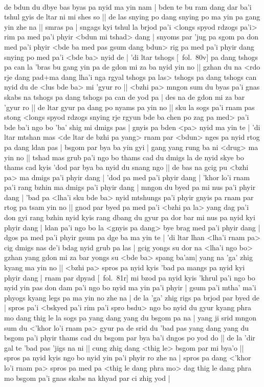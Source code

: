 \documentclass[12pt]{article}
\begin{document}
\textbf{\TVB}\\
de bdun du dbye bas byas pa nyid ma yin nam | bden te bu ram dang dar ba'i tshul gyis de ltar ni mi shes so || de las snying po dang snying po ma yin pa gang yin zhe na || smras pa | sngags kyi tshul la brjod pa'i <longs spyod rdzogs pa'i> rim pa med pa'i phyir <bdun mi tshad> dang | snyoms par 'jug pa sgom pa don med pa'i phyir <bde ba med pas gsum dang bdun> rig pa med pa'i phyir dang snying po med pa'i <bde ba> nyid de | 'di ltar tshogs [\TVB\ fol.\ 80v] pa dang tshogs pa can la 'bras bu gang yin pa de gdon mi za ba nyid yin no || gzhan du na <rdo rje dang pad+ma dang lha'i nga rgyal tshogs pa las> tshogs pa dang tshogs can nyid du de <lus bde ba> mi 'gyur ro || <bzhi pa> mngon sum du byas pa'i gnas skabs na tshogs pa dang tshogs pa can de yod pa | des na de gdon mi za bar 'gyur ro || de ltar gyur pa dang po nyams pa yin no || sku la sogs pa'i rnam pas stong <longs spyod rdzogs snying rje rgyun bde ba chen po zag pa med> pa'i bde ba'i ngo bo 'ba' shig mi dmigs pas | gnyis pa bden <pa> nyid ma yin te | 'di ltar mtshan mas <de ltar de bzhi pa yang> rnam par <bdun> nges pa nyid rtog pa dang ldan pas | bsgom par bya ba yin gyi | gang yang rung ba ni <drug> ma yin no || tshad mas grub pa'i ngo bo thams cad du dmigs la de nyid skye bo thams cad kyis 'dod par bya ba nyid du snang ngo || de bas na gcig pu <bzhi pa> ma dmigs pa'i phyir dang | 'dod pa med pa'i phyir dang | 'khor lo'i rnam pa'i rang bzhin ma dmigs pa'i phyir dang | mngon du byed pa mi nus pa'i phyir dang | 'bad pa <lha'i sku bde ba> nyid mtshungs pa'i phyir gnyis pa rnam par rtog pa tsam yin no || gnod par byed pa med pa'i <bzhi pa la> yang dag pa'i don gyi rang bzhin nyid kyis rang dbang du gyur pa dor bar mi nus pa nyid kyi phyir dang | ldan pa'i ngo bo la <gnyis pa dang> bye brag med pa'i phyir dang | dgos pa med pa'i phyir gsum pa dge ba ma yin te | 'di ltar lhan <lha'i rnam pa> cig dmigs nas de'i bdag nyid grub pa las | gcig yongs su dor na <lha'i ngo bo> gzhan yang gdon mi za bar yongs su <bde ba> spang ba'am| yang na 'ga' zhig kyang ma yin no || <bzhi pa> spros pa nyid kyis 'bad pa mangs pa nyid kyi phyir dang | rnam par dpyad [\TVB\ fol.\ 81r] mi bzod pa nyid kyis 'khrul pa'i ngo bo nyid yin pas don dam pa'i ngo bo nyid ma yin pa'i phyir | gsum pa'i mtha' ma'i phyogs kyang legs pa ma yin no zhe na | de la 'ga' zhig rigs pa brjod par byed de | spros pa'i <bskyed pa'i rim pa'i spro bsdu> ngo bo nyid du gyur kyang phra mo dang thig le la sogs pa yang dang yang du bsgom pa na | yang ji srid mngon sum du <'khor lo'i rnam pa> gyur pa de srid du 'bad pas yang dang yang du bsgom pa'i phyir thams cad du bsgom par bya ba'i dngos po yod do || de la 'dir gal te 'bad pas 'jigs na ni || cung zhig dang <thig le> bsgom par mi bya'o || spros pa nyid kyis ngo bo nyid yin pa'i phyir ro zhe na | spros pa dang <'khor lo'i rnam pa> spros pa med pa <thig le dang phra mo> dag thig le dang phra mo bsgom pa'i gnas skabs na khyad par ci zhig yod |\\
\end{document}
